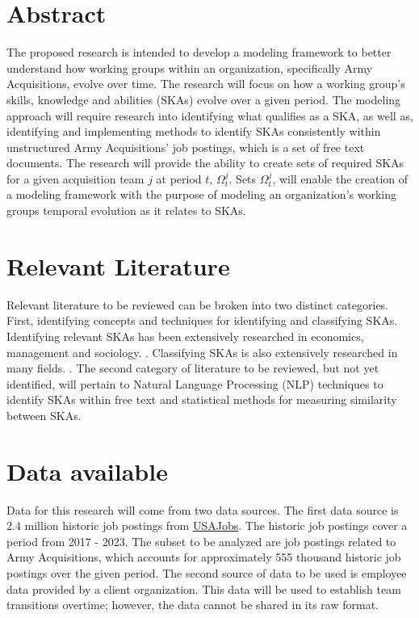 \documentclass[12pt]{article}
\begin{document}
\section*{Abstract}

The proposed research is intended to develop a modeling framework to better understand how working groups within an organization, specifically Army Acquisitions, evolve over time. The research will focus on how a working group's skills, knowledge and abilities (SKAs) evolve over a given period. The modeling approach will require research into identifying what qualifies as a SKA, as well as, identifying and implementing methods to identify SKAs consistently within unstructured Army Acquisitions’ job postings, which is a set of free text documents. The research will provide the ability to create sets of required SKAs for a given acquisition team $j$ at period $t$, $\Omega_t^j$. Sets $\Omega_t^j$, will enable the creation of a modeling framework with the purpose of modeling an organization's working groups temporal evolution as it relates to SKAs.

\section{Relevant Literature}

Relevant literature to be reviewed can be broken into two distinct categories. First, identifying concepts and techniques for identifying and classifying SKAs. Identifying relevant SKAs has been extensively researched in economics, management and sociology. \cite{investment_human_capital, task_specific, on_the_mechanics, diversification}. Classifying SKAs is also extensively researched in many fields. \cite{specialization_career,industry-specific_human_capital, human_capital_specificity}. The second category of literature to be reviewed, but not yet identified, will pertain to Natural Language Processing (NLP) techniques to identify SKAs within free text and statistical methods for measuring similarity between SKAs.

\section{Data available}

Data for this research will come from two data sources. The first data source is 2.4 million historic job postings from \href{https://www.usajobs.gov}{USAJobs}. The historic job postings cover a period from 2017 - 2023. The subset to be analyzed are job postings related to Army Acquisitions, which accounts for approximately 555 thousand historic job postings over the given period. The second source of data to be used is employee data provided by a client organization. This data will be used to establish team transitions overtime; however, the data cannot be shared in its raw format.
\end{document}
